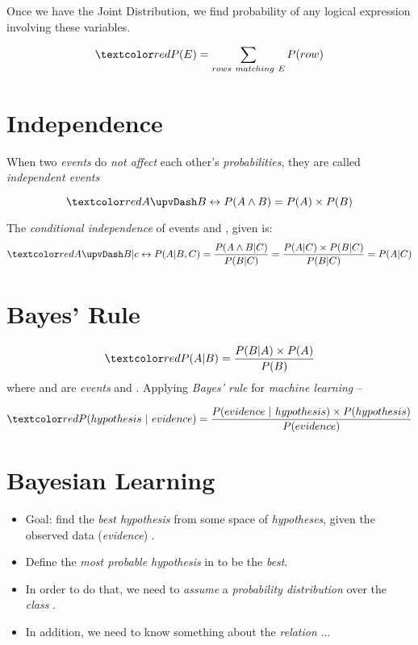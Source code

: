 \documentclass[
	number={3},
	title={Na\:ive Bayes Learning}
]{cs584notes}
\begin{document}
Once we have the Joint Distribution, we find probability of any logical expression involving these variables.

\[ \data{P(E) = \sum_{rows\ matching\ E}P(row)} \]

\section{Independence}\label{sec:independence}
When two \emph{events} do \emph{not affect} each other's \emph{probabilities}, they are called \emph{independent events}

\[ \data{ A \upvDash B \leftrightarrow P(A\land B) = P(A)\times P(B) } \]

The \emph{conditional independence} of events  and , given  is:
\[ \data{ A \upvDash B | c \leftrightarrow P(A|B,C) = \frac{P(A\land B|C)}{P(B|C)} = \frac{P(A|C)\times P(B|C)}{P(B|C)} = P(A|C) } \]

\section{Bayes' Rule}\label{sec:bayes'-rule}
\begin{equation}
	\data{P(A|B) = \frac{P(B|A)\times P(A)}{P(B)}}
	\label{eq:bayes-rule}
\end{equation}
where  and  are \emph{events} and .
Applying \emph{Bayes' rule} for \emph{machine learning} --

\begin{equation}
	\data{P(hypothesis\ |\ evidence) = \frac{P(evidence\ |\ hypothesis)\times P(hypothesis)}{P(evidence)}}
	\label{eq:bayes-rule-ml}
\end{equation}

\section{Bayesian Learning}\label{sec:bayesian-learning}
\begin{itemize}
	\item Goal: find the \emph{best hypothesis} from some space  of \emph{hypotheses}, given the observed data (\emph{evidence}) .
	\item Define the \emph{most probable hypothesis} in  to be the \emph{best}.
	\item In order to do that, we need to \emph{assume} a \emph{probability distribution} over the \emph{class} .
	\item In addition, we need to know something about the \emph{relation} $\dots$
\end{itemize}
\end{document}
